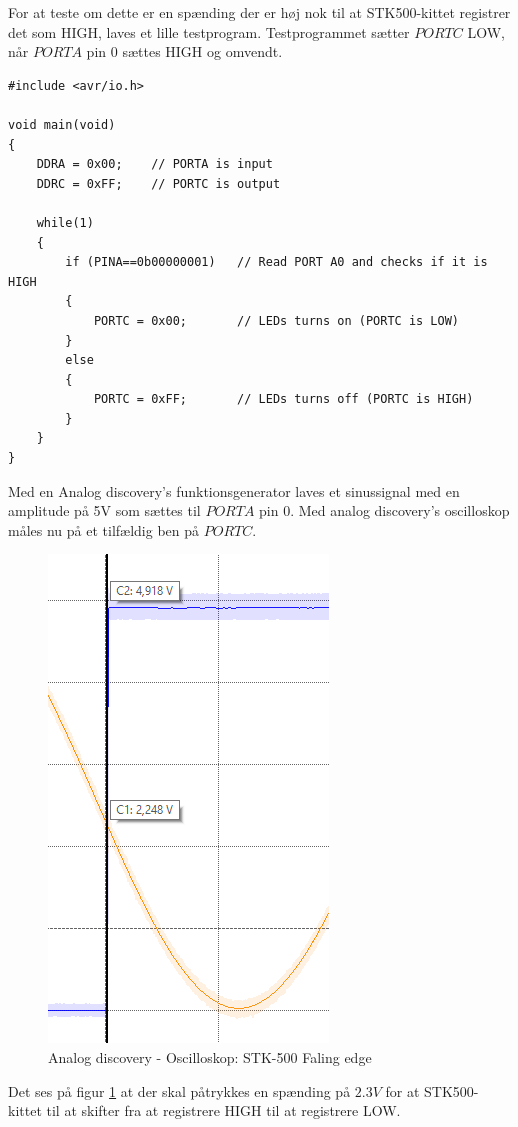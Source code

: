 For at teste om dette er en spænding der er høj nok til at STK500-kittet registrer det som HIGH, laves et lille testprogram. Testprogrammet sætter $PORT C$ LOW, når $PORT A$ pin 0 sættes HIGH og omvendt.

\begin{lstlisting}
#include <avr/io.h>

void main(void)
{
	DDRA = 0x00;	// PORTA is input
	DDRC = 0xFF;	// PORTC is output
	
	while(1)
	{
		if (PINA==0b00000001)	// Read PORT A0 and checks if it is HIGH
		{
			PORTC = 0x00;		// LEDs turns on (PORTC is LOW)
		}
		else
		{
			PORTC = 0xFF;		// LEDs turns off (PORTC is HIGH)
		}
	}
}
\end{lstlisting}

Med en Analog discovery's funktionsgenerator laves et sinussignal med en amplitude på 5V som sættes til $PORT A$ pin 0. Med analog discovery's oscilloskop måles nu på et tilfældig ben på $PORT C$.

\begin{figure}[h]
	\centering
	\includegraphics[scale=0.7, trim=0 0 0 0, clip=true]{../Implementering/billeder/STK_FALING.png}
	\caption{Analog discovery - Oscilloskop: STK-500 Faling edge}
	\label{fig:STK_FALING}
\end{figure}

Det ses på figur \ref{fig:STK_FALING} at der skal påtrykkes en spænding på $2.3V$ for at STK500-kittet til at skifter fra at registrere HIGH til at registrere LOW.

